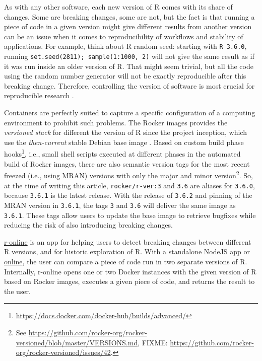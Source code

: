 As with any other software, each new version of R comes with its share
of changes. Some are breaking changes, some are not, but the fact is
that running a piece of code in a given version might give different
results from another version can be an issue when it comes to
reproducibility of workflows and stability of applications. For example,
think about R random seed: starting with \texttt{R\ 3.6.0}, running
\texttt{set.seed(2811);\ sample(1:1000,\ 2)} will not give the same
result as if it was run inside an older version of R. That might seem
trivial, but all the code using the random number generator will not be
exactly reproducible after this breaking change. Therefore, controlling
the version of software is most crucial for reproducible research
\citep[e.g.][]{boettiger_introduction_2015}.

Containers are perfectly suited to capture a specific configuration of a
computing environment to prohibit such problems. The Rocker images
provides the \emph{versioned stack} for different the version of R since
the project inception, which use the \emph{then-current} stable Debian
base image \citep[cf.][]{RJ-2017-065}. Based on custom build phase
hooks\footnote{\href{https://docs.docker.com/docker-hub/builds/advanced/}{https://docs.docker.com/docker-hub/builds/advanced/}},
i.e., small shell scripts executed at different phases in the automated
build of Rocker images, there are also semantic version tags for the
most recent freezed (i.e., using MRAN) versions with only the major and
minor
version\footnote{See \href{https://github.com/rocker-org/rocker-versioned/blob/master/VERSIONS.md}{https://github.com/rocker-org/rocker-versioned/blob/master/VERSIONS.md}, FIXME: \href{https://github.com/rocker-org/rocker-versioned/issues/42}{https://github.com/rocker-org/rocker-versioned/issues/42}.}.
So, at the time of writing this article, \texttt{rocker/r-ver:3} and
\texttt{3.6} are aliases for \texttt{3.6.0}, because \texttt{3.6.1} is
the latest release. With the release of \texttt{3.6.2} and pinning of
the MRAN version in \texttt{3.6.1}, the tags \texttt{3} and \texttt{3.6}
will deliver the same image as \texttt{3.6.1}. These tags allow users to
update the base image to retrieve bugfixes while reducing the risk of
also introducing breaking changes.

\href{https://github.com/ColinFay/ronline}{r-online} is an app for
helping users to detect breaking changes between different R versions,
and for historic exploration of R. With a standalone NodeJS app or
\href{https://srv.colinfay.me/r-online}{online}, the user can compare a
piece of code run in two separate versions of R. Internally, r-online
opens one or two Docker instances with the given version of R based on
Rocker images, executes a given piece of code, and returns the result to
the user.

